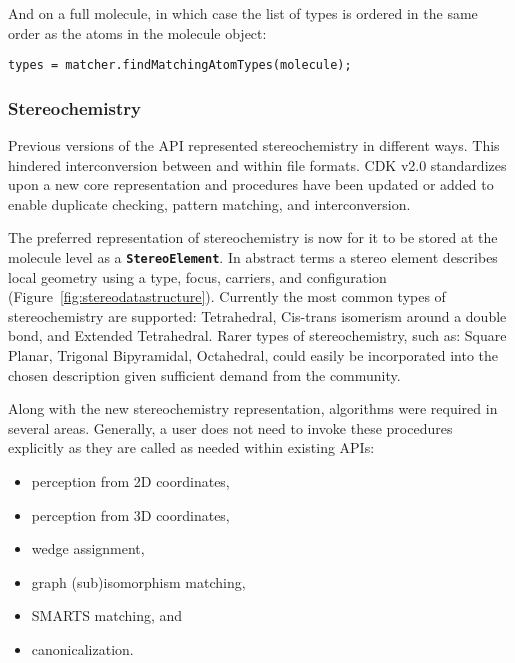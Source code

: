 \documentclass[doublespacing]{bmcart}
\def \cdkversion {v2.0}
\begin{document}
And on a full molecule, in which case the list of types is ordered in the same
order as the atoms in the molecule object:

\vspace{0.2cm}
\begin{verbatim}
types = matcher.findMatchingAtomTypes(molecule);
\end{verbatim}
\vspace{0.2cm}

  \subsubsection*{Stereochemistry}

  Previous versions of the API represented stereochemistry in different ways. This hindered
  interconversion between and within file formats. CDK \cdkversion{} standardizes
  upon a new core representation and procedures have been updated or added to
  enable duplicate checking, pattern matching, and interconversion.

  The preferred representation of stereochemistry is now for it to be stored at the molecule
  level as a \texttt{\textbf{StereoElement}}. In abstract terms a stereo element describes local
  geometry using a type, focus, carriers, and configuration (Figure~\ref{fig:stereodatastructure}).
  Currently the most common types of stereochemistry are supported: Tetrahedral, Cis-trans isomerism 
  around a double bond, and Extended Tetrahedral. Rarer types of stereochemistry, such as: Square 
  Planar, Trigonal Bipyramidal, Octahedral, could easily be incorporated into the chosen description 
   given sufficient demand from the community.


  Along with the new stereochemistry representation, algorithms were required in several areas. Generally,
  a user does not need to invoke these procedures explicitly as they are called as needed within existing
  APIs:

\vspace{0.2cm}
  \begin{itemize}
   \item perception from 2D coordinates,
   \item perception from 3D coordinates,
   \item wedge assignment,
   \item graph (sub)isomorphism matching,
   \item SMARTS matching, and
   \item canonicalization.
  \end{itemize}
\vspace{0.2cm}
\end{document}
